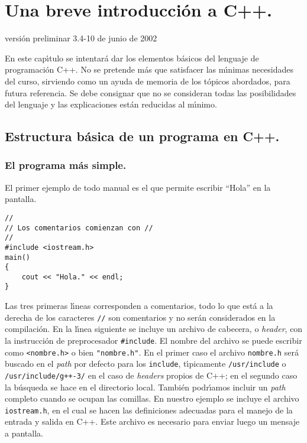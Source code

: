 \chapter{Una breve introducci{\'o}n a C++.}

\vspace{-1cm}
\hfill {\tiny versi{\'o}n  preliminar 3.4-10 de junio de 2002}

En este cap{\'\i}tulo se intentar{\'a} dar los elementos b{\'a}sicos del lenguaje
de programaci{\'o}n C++.  No se pretende m{\'a}s que satisfacer las m{\'\i}nimas
necesidades del curso, sirviendo como un ayuda de memoria de los
t{\'o}picos abordados, para futura referencia. Se debe consignar que no se
consideran todas las posibilidades del lenguaje y las explicaciones
est{\'a}n reducidas al m{\'\i}nimo.

\section{Estructura b{\'a}sica de un programa en C++.}

\subsection{El programa m{\'a}s simple.}

El primer ejemplo de todo manual es el que permite escribir ``Hola''
en la pantalla.

\begin{verbatim}
//
// Los comentarios comienzan con //
//
#include <iostream.h>
main()
{
    cout << "Hola." << endl;
}
\end{verbatim}

Las tres primeras l{\'\i}neas corresponden a comentarios, todo lo que est{\'a}
a la derecha de los caracteres \verb+//+ son comentarios y no ser{\'a}n
considerados en la compilaci{\'o}n. En la l{\'\i}nea siguiente se incluye un
archivo de cabecera, o {\it header}, con la instrucci{\'o}n de
preprocesador \verb+#include+. El nombre del archivo se puede escribir
como \verb+<nombre.h>+ o bien \verb+"nombre.h"+. En el primer caso
el archivo \verb+nombre.h+ ser{\'a} buscado en el {\it path} por defecto
para los \verb+include+, t{\'\i}picamente \verb+/usr/include+ o
\verb|/usr/include/g++-3/| en el caso de {\it headers} propios de C++;
en el segundo caso la b{\'u}squeda se hace en el directorio local. Tambi{\'e}n
podr{\'\i}amos incluir un {\it path} completo cuando se ocupan las comillas. En
nuestro ejemplo se incluye el archivo \verb+iostream.h+, en el cual se
hacen las definiciones adecuadas para el manejo de la entrada y salida
en C++.  Este archivo es necesario para enviar luego un mensaje a
pantalla. 

